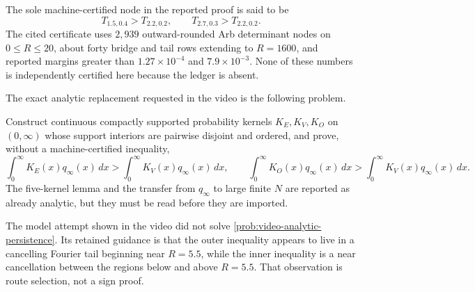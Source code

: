 The sole machine-certified node in the reported proof is said to be
\begin{equation}
 T_{1.5,0.4}>T_{2.2,0.2},\qquad
 T_{2.7,0.3}>T_{2.2,0.2}.
 \label{eq:video-tent-inequalities}
\end{equation}
The cited certificate uses $2{,}939$ outward-rounded Arb determinant nodes on
$0\leq R\leq20$, about forty bridge and tail rows extending to $R=1600$, and reported
margins greater than $1.27\times10^{-4}$ and $7.9\times10^{-3}$.  None of these numbers
is independently certified here because the ledger is absent.

The exact analytic replacement requested in the video is the following problem.

\begin{obligation}
\label{prob:video-analytic-persistence}
Construct continuous compactly supported probability kernels
$K_E,K_V,K_O$ on $(0,\infty)$ whose support interiors are pairwise disjoint and ordered,
and prove, without a machine-certified inequality,
\begin{equation}
 \int_0^\infty K_E(x)q_\infty(x)\,dx
 >\int_0^\infty K_V(x)q_\infty(x)\,dx,
 \qquad
 \int_0^\infty K_O(x)q_\infty(x)\,dx
 >\int_0^\infty K_V(x)q_\infty(x)\,dx.
 \label{eq:video-analytic-persistence-target}
\end{equation}
The five-kernel lemma and the transfer from $q_\infty$ to large finite $N$ are reported
as already analytic, but they must be read before they are imported.
\end{obligation}

The model attempt shown in the video did not solve
\cref{prob:video-analytic-persistence}.  Its retained guidance is that the outer
inequality appears to live in a cancelling Fourier tail beginning near $R=5.5$, while the
inner inequality is a near cancellation between the regions below and above $R=5.5$.
That observation is route selection, not a sign proof.

